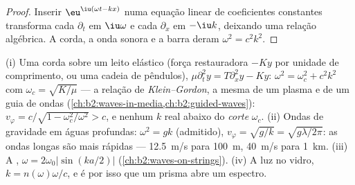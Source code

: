 \begin{proof}
Inserir $\eu^{\iu(\omega t - kx)}$ numa equação linear de coeficientes
constantes transforma cada $\partial_t$ em $\iu\omega$ e cada $\partial_x$ em
$-\iu k$, deixando uma relação algébrica. A corda, a onda sonora e
a barra deram $\omega^2 = c^2k^2$.
\end{proof}

\begin{example}\label{ex:b2:dispersion-wave-packets:examples}
(i) Uma corda sobre um leito elástico (força restauradora $-Ky$ por unidade de comprimento,
ou uma cadeia de pêndulos), $\mu\partial_t^2y = T\partial_x^2y - Ky$: $\omega^2 = \omega_c^2
+ c^2k^2$ com $\omega_c = \sqrt{K/\mu}$ --- a relação de \emph{Klein--Gordon},
a mesma de um plasma e de um guia de ondas
(\cref{ch:b2:waves-in-media,ch:b2:guided-waves}): $v_\varphi = c/\sqrt{1 -
\omega_c^2/\omega^2} > c$, e nenhum $k$ real abaixo do \emph{corte} $\omega_c$.
(ii) Ondas de gravidade em águas profundas: $\omega^2 = gk$ (admitido), $v_\varphi =
\sqrt{g/k} = \sqrt{g\lambda/2\pi}$: as ondas longas são mais rápidas --- \qty{12.5}{m/s} para
\qty{100}{m}, \qty{40}{m/s} para \qty{1}{km}. (iii) A , $\omega =
2\omega_0|\sin(ka/2)|$ (\cref{ch:b2:waves-on-strings}). (iv) A luz no vidro,
$k = n(\omega)\omega/c$, e é por isso que um prisma abre um espectro.
\end{example}

